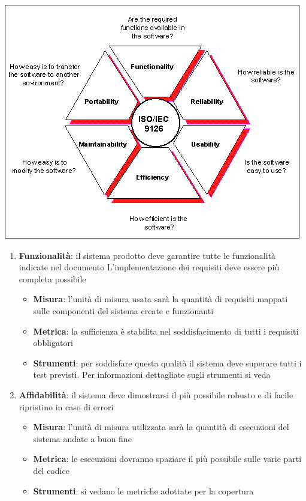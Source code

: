 {  \begin{center}
    \includegraphics[scale=0.5]{img/9126s.png}
  \end{center}




  \begin{enumerate}
  \item \textbf{Funzionalità}: il sistema prodotto deve garantire tutte
    le funzionalità indicate nel documento \emph{\analisideirequisiti} L'implementazione dei requisiti deve essere più completa
    possibile

    \begin{itemize}
    \item \textbf{Misura}: l'unità di misura usata sarà la quantità di requisiti mappati sulle componenti del sistema create e funzionanti
    \item \textbf{Metrica}: la sufficienza è stabilita nel soddisfacimento di tutti i requisiti obbligatori
    \item \textbf{Strumenti}: per soddisfare questa qualità il sistema deve superare tutti i test previsti.
      Per informazioni dettagliate sugli strumenti si veda  \emph{\normediprogetto}
    \end{itemize}

  \item \textbf{Affidabilità}: il sistema deve dimostrarsi il più possibile robusto e di facile ripristino in caso di errori

    \begin{itemize}
    \item \textbf{Misura}: l’unità di misura utilizzata sarà la quantità di esecuzioni del sistema andate a buon fine
    \item \textbf{Metrica}: le esecuzioni dovranno spaziare il più
      possibile sulle varie parti del codice
    \item \textbf{Strumenti}: si vedano le metriche adottate per la
      copertura %
    \end{itemize}


\end{enumerate}}
